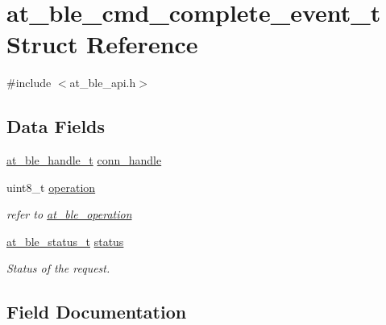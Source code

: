 \hypertarget{structat__ble__cmd__complete__event__t}{}\section{at\+\_\+ble\+\_\+cmd\+\_\+complete\+\_\+event\+\_\+t Struct Reference}
\label{structat__ble__cmd__complete__event__t}


{\ttfamily \#include $<$at\+\_\+ble\+\_\+api.\+h$>$}

\subsection*{Data Fields}
\begin{DoxyCompactItemize}
\item 
\mbox{\hyperlink{at__ble__api_8h_abd23646d0c662860741f787efc8456f2}{at\+\_\+ble\+\_\+handle\+\_\+t}} \mbox{\hyperlink{structat__ble__cmd__complete__event__t_ae42df6fd8493f8f8faeccfdd6062e96f}{conn\+\_\+handle}}
\item 
uint8\+\_\+t \mbox{\hyperlink{structat__ble__cmd__complete__event__t_a97d486d6926f9137837e1d8ecf0bbfdd}{operation}}
\begin{DoxyCompactList}\small\item\em refer to \mbox{\hyperlink{at__ble__api_8h_a9660b10ef751ef8858a2c291518031a6}{at\+\_\+ble\+\_\+operation}} \end{DoxyCompactList}\item 
\mbox{\hyperlink{group__error__codes__group_ga3b1db9b95feb157b3c188ca27fe76988}{at\+\_\+ble\+\_\+status\+\_\+t}} \mbox{\hyperlink{structat__ble__cmd__complete__event__t_a0b48093fc2030779fc47e5216f8019e2}{status}}
\begin{DoxyCompactList}\small\item\em Status of the request. \end{DoxyCompactList}\end{DoxyCompactItemize}


\subsection{Field Documentation}
\mbox{\label{structat__ble__cmd__complete__event__t_ae42df6fd8493f8f8faeccfdd6062e96f}} 
